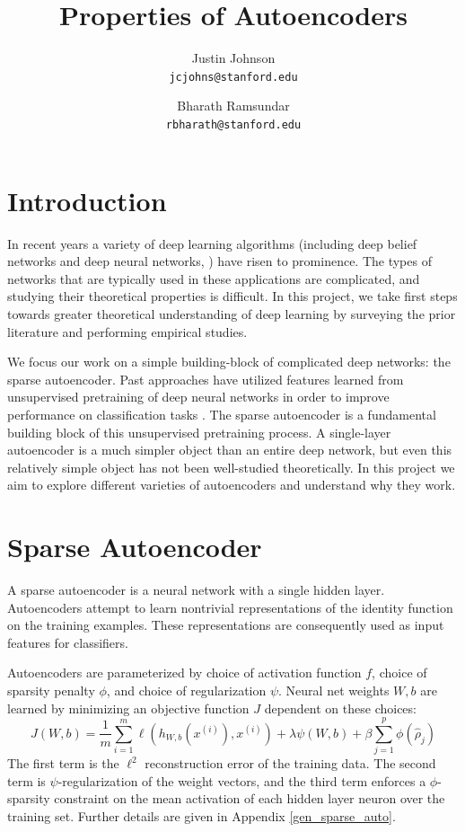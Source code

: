 \documentclass[twocolumn]{article}
\title{Properties of Autoencoders}
\author{%
    Justin Johnson \\
    \texttt{jcjohns@stanford.edu}
  \and
    Bharath Ramsundar \\
    \texttt{rbharath@stanford.edu}
}
\date{}
\newcommand{\xii}{x^{(i)}}
\begin{document}
\maketitle

\section{Introduction}
In recent years a variety of deep learning algorithms (including deep belief
networks \cite{hinton2006fast,lee2009convolutional} and deep neural networks,
\cite{krizhevsky2012imagenet,le2011building}) have risen to prominence.
The types of networks that are typically used in these applications are 
complicated, and studying their theoretical properties is difficult. In this
project, we take first steps towards greater theoretical understanding of
deep learning by surveying the prior literature and performing empirical
studies.

We focus our work on a simple building-block of complicated deep networks: the
sparse autoencoder. Past approaches have utilized features learned from
unsupervised pretraining of deep neural networks in order to improve performance
on classification tasks \cite{le2011building}. The sparse autoencoder is a
fundamental building block of this unsupervised pretraining process. A
single-layer autoencoder is a much simpler object than an entire deep network,
but even this relatively simple object has not been well-studied theoretically.
In this project we aim to explore different varieties of autoencoders and
understand why they work.

\section{Sparse Autoencoder} A sparse autoencoder is a neural network with a
single hidden layer. Autoencoders attempt to learn nontrivial representations
of the identity function on the training examples. These representations are
consequently used as input features for classifiers. 

Autoencoders are parameterized by choice of activation function $f$, choice of
sparsity penalty $\phi$, and choice of regularization $\psi$.  Neural net weights $W,b$
are learned by minimizing an objective function $J$ dependent on these choices:
\[J(W,b)=\frac1m\sum_{i=1}^m\ell(h_{W,b}(\xii),\xii)+\lambda\psi(W,b)+\beta\sum_{j=1}^p\phi(\hat\rho_j)\]
The first term is the $\ell^2$ reconstruction error of the training
data. The second term is $\psi$-regularization of the weight vectors, and the
third term enforces a $\phi$-sparsity constraint on the mean activation of each hidden layer neuron over the training set. Further details are given in Appendix
\ref{gen_sparse_auto}.
\end{document}

